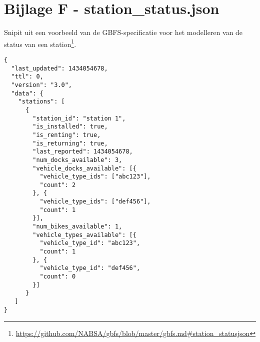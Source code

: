 \clearpage
\section*{Bijlage F - station\_status.json}
Snipit uit een voorbeeld van de GBFS-specificatie voor het modelleren van de status van een station\footnote{\url{https://github.com/NABSA/gbfs/blob/master/gbfs.md\#station_statusjson}}.

\begin{code}
\begin{verbatim}
{
  "last_updated": 1434054678,
  "ttl": 0,
  "version": "3.0",
  "data": {
    "stations": [
      {
        "station_id": "station 1",
        "is_installed": true,
        "is_renting": true,
        "is_returning": true,
        "last_reported": 1434054678,
        "num_docks_available": 3,
        "vehicle_docks_available": [{
          "vehicle_type_ids": ["abc123"],
          "count": 2
        }, {
          "vehicle_type_ids": ["def456"],
          "count": 1
        }],
        "num_bikes_available": 1,
        "vehicle_types_available": [{
          "vehicle_type_id": "abc123",
          "count": 1
        }, {
          "vehicle_type_id": "def456",
          "count": 0
        }]        
      }
   ]
}
\end{verbatim}
\end{code}